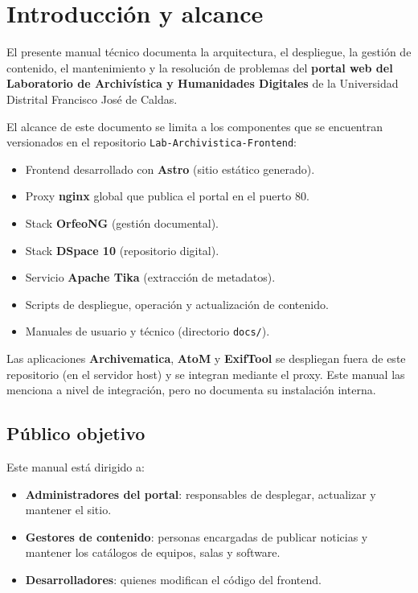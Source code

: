 \documentclass[12pt,a4paper]{report}
\begin{document}
\portadalab

\tableofcontents
\thispagestyle{chapternoline}

\chapter{Introducción y alcance}

El presente manual técnico documenta la arquitectura, el despliegue, la
gestión de contenido, el mantenimiento y la resolución de problemas del
\textbf{portal web del Laboratorio de Archivística y Humanidades Digitales} de
la Universidad Distrital Francisco José de Caldas.

El alcance de este documento se limita a los componentes que se encuentran
versionados en el repositorio \texttt{Lab-Archivistica-Frontend}:

\begin{itemize}
  \item Frontend desarrollado con \textbf{Astro} (sitio estático generado).
  \item Proxy \textbf{nginx} global que publica el portal en el puerto 80.
  \item Stack \textbf{OrfeoNG} (gestión documental).
  \item Stack \textbf{DSpace 10} (repositorio digital).
  \item Servicio \textbf{Apache Tika} (extracción de metadatos).
  \item Scripts de despliegue, operación y actualización de contenido.
  \item Manuales de usuario y técnico (directorio \texttt{docs/}).
\end{itemize}

Las aplicaciones \textbf{Archivematica}, \textbf{AtoM} y \textbf{ExifTool} se
despliegan fuera de este repositorio (en el servidor host) y se integran
mediante el proxy. Este manual las menciona a nivel de integración, pero no
documenta su instalación interna.

\section{Público objetivo}

Este manual está dirigido a:

\begin{itemize}
  \item \textbf{Administradores del portal}: responsables de desplegar,
        actualizar y mantener el sitio.
  \item \textbf{Gestores de contenido}: personas encargadas de publicar
        noticias y mantener los catálogos de equipos, salas y software.
  \item \textbf{Desarrolladores}: quienes modifican el código del frontend.
\end{itemize}
\end{document}
